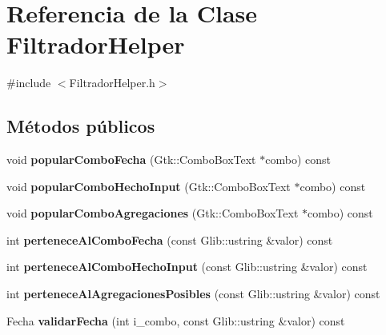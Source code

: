 \hypertarget{classFiltradorHelper}{\section{\-Referencia de la \-Clase \-Filtrador\-Helper}
\label{classFiltradorHelper}
}


{\ttfamily \#include $<$\-Filtrador\-Helper.\-h$>$}

\subsection*{\-Métodos públicos}
\begin{DoxyCompactItemize}
\item 
\hypertarget{classFiltradorHelper_a44da10526a5a9813f6fc689205f33d6e}{void {\bfseries popular\-Combo\-Fecha} (\-Gtk\-::\-Combo\-Box\-Text $\ast$combo) const }\label{classFiltradorHelper_a44da10526a5a9813f6fc689205f33d6e}

\item 
\hypertarget{classFiltradorHelper_a0f4fbd4496e7f7d25d3e16d19f5c016f}{void {\bfseries popular\-Combo\-Hecho\-Input} (\-Gtk\-::\-Combo\-Box\-Text $\ast$combo) const }\label{classFiltradorHelper_a0f4fbd4496e7f7d25d3e16d19f5c016f}

\item 
\hypertarget{classFiltradorHelper_a1f8de0e2977088a0a8d6063fa6b7500e}{void {\bfseries popular\-Combo\-Agregaciones} (\-Gtk\-::\-Combo\-Box\-Text $\ast$combo) const }\label{classFiltradorHelper_a1f8de0e2977088a0a8d6063fa6b7500e}

\item 
\hypertarget{classFiltradorHelper_a7843f8f831fd645fc141f1405e310de7}{int {\bfseries pertenece\-Al\-Combo\-Fecha} (const \-Glib\-::ustring \&valor) const }\label{classFiltradorHelper_a7843f8f831fd645fc141f1405e310de7}

\item 
\hypertarget{classFiltradorHelper_ac50d803953d4e5a0c2ba309453f4940c}{int {\bfseries pertenece\-Al\-Combo\-Hecho\-Input} (const \-Glib\-::ustring \&valor) const }\label{classFiltradorHelper_ac50d803953d4e5a0c2ba309453f4940c}

\item 
\hypertarget{classFiltradorHelper_ad155e8c6b67f780f790a144128d5a467}{int {\bfseries pertenece\-Al\-Agregaciones\-Posibles} (const \-Glib\-::ustring \&valor) const }\label{classFiltradorHelper_ad155e8c6b67f780f790a144128d5a467}

\item 
\hypertarget{classFiltradorHelper_a4fd7f1c5e3b36dd1055a0401a34101f7}{\-Fecha {\bfseries validar\-Fecha} (int i\-\_\-combo, const \-Glib\-::ustring \&valor) const }\label{classFiltradorHelper_a4fd7f1c5e3b36dd1055a0401a34101f7}


\end{DoxyCompactItemize}
